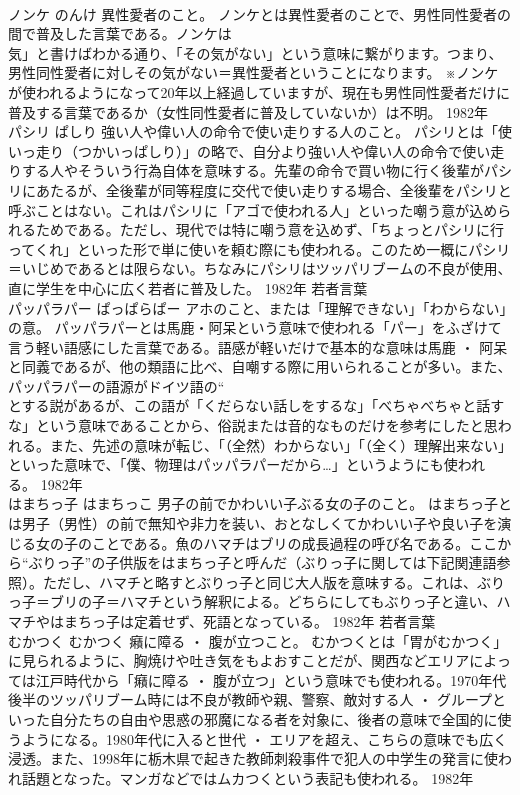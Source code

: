 \documentclass[8pt]{extreport}
\begin{document}
\begin{CJK}{UTF8}{min}
\\	ノンケ	のんけ	異性愛者のこと。	ノンケとは異性愛者のことで、男性同性愛者の間で普及した言葉である。ノンケは
\\	気」と書けばわかる通り、「その気がない」という意味に繋がります。つまり、男性同性愛者に対しその気がない＝異性愛者ということになります。 ※ノンケが使われるようになって20年以上経過していますが、現在も男性同性愛者だけに普及する言葉であるか（女性同性愛者に普及していないか）は不明。	1982年	
\\	パシリ	ぱしり	強い人や偉い人の命令で使い走りする人のこと。	パシリとは「使いっ走り（つかいっぱしり）」の略で、自分より強い人や偉い人の命令で使い走りする人やそういう行為自体を意味する。先輩の命令で買い物に行く後輩がパシリにあたるが、全後輩が同等程度に交代で使い走りする場合、全後輩をパシリと呼ぶことはない。これはパシリに「アゴで使われる人」といった嘲う意が込められるためである。ただし、現代では特に嘲う意を込めず、「ちょっとパシリに行ってくれ」といった形で単に使いを頼む際にも使われる。このため一概にパシリ＝いじめであるとは限らない。ちなみにパシリはツッパリブームの不良が使用、直に学生を中心に広く若者に普及した。	1982年	若者言葉	
\\	パッパラパー	ぱっぱらぱー	アホのこと、または「理解できない」「わからない」の意。	パッパラパーとは馬鹿・阿呆という意味で使われる「パー」をふざけて言う軽い語感にした言葉である。語感が軽いだけで基本的な意味は馬鹿 ・ 阿呆と同義であるが、他の類語に比べ、自嘲する際に用いられることが多い。また、パッパラパーの語源がドイツ語の“
\\	とする説があるが、この語が「くだらない話しをするな」「べちゃべちゃと話すな」という意味であることから、俗説または音的なものだけを参考にしたと思われる。また、先述の意味が転じ、「（全然）わからない」「（全く）理解出来ない」といった意味で、「僕、物理はパッパラパーだから…」というようにも使われる。	1982年	
\\	はまちっ子	はまちっこ	男子の前でかわいい子ぶる女の子のこと。	はまちっ子とは男子（男性）の前で無知や非力を装い、おとなしくてかわいい子や良い子を演じる女の子のことである。魚のハマチはブリの成長過程の呼び名である。ここから“ぶりっ子”の子供版をはまちっ子と呼んだ（ぶりっ子に関しては下記関連語参照）。ただし、ハマチと略すとぶりっ子と同じ大人版を意味する。これは、ぶりっ子＝ブリの子＝ハマチという解釈による。どちらにしてもぶりっ子と違い、ハマチやはまちっ子は定着せず、死語となっている。	1982年	若者言葉	
\\	むかつく	むかつく	癪に障る ・ 腹が立つこと。	むかつくとは「胃がむかつく」に見られるように、胸焼けや吐き気をもよおすことだが、関西などエリアによっては江戸時代から「癪に障る ・ 腹が立つ」という意味でも使われる。1970年代後半のツッパリブーム時には不良が教師や親、警察、敵対する人 ・ グループといった自分たちの自由や思惑の邪魔になる者を対象に、後者の意味で全国的に使うようになる。1980年代に入ると世代 ・ エリアを超え、こちらの意味でも広く浸透。また、1998年に栃木県で起きた教師刺殺事件で犯人の中学生の発言に使われ話題となった。マンガなどではムカつくという表記も使われる。	1982年	

\end{CJK}
\end{document}
